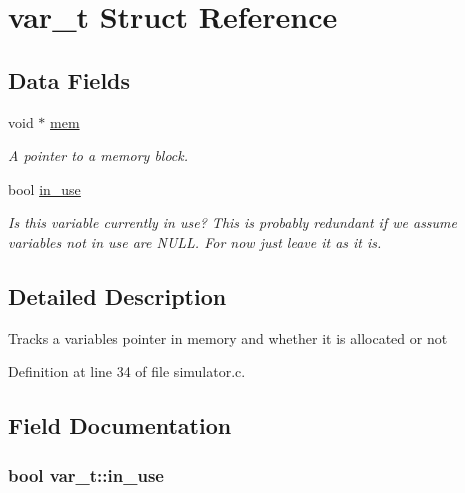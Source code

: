 \hypertarget{structvar__t}{}\section{var\+\_\+t Struct Reference}
\label{structvar__t}
\subsection*{Data Fields}
\begin{DoxyCompactItemize}
\item 
void $\ast$ \hyperlink{structvar__t_a10c34ec2d6e86f971cf9702a4651267d}{mem}
\begin{DoxyCompactList}\small\item\em A pointer to a memory block. \end{DoxyCompactList}\item 
bool \hyperlink{structvar__t_ac304039a94e589f7d11f4ec3353abab4}{in\+\_\+use}
\begin{DoxyCompactList}\small\item\em Is this variable currently in use? This is probably redundant if we assume variables not in use are N\+U\+LL. For now just leave it as it is. \end{DoxyCompactList}\end{DoxyCompactItemize}


\subsection{Detailed Description}
Tracks a variable\textquotesingle{}s pointer in memory and whether it is allocated or not 

Definition at line 34 of file simulator.\+c.



\subsection{Field Documentation}
\subsubsection[{\texorpdfstring{in\+\_\+use}{in\_use}}]{\setlength{\rightskip}{0pt plus 5cm}bool var\+\_\+t\+::in\+\_\+use}\hypertarget{structvar__t_ac304039a94e589f7d11f4ec3353abab4}{}\label{structvar__t_ac304039a94e589f7d11f4ec3353abab4}



